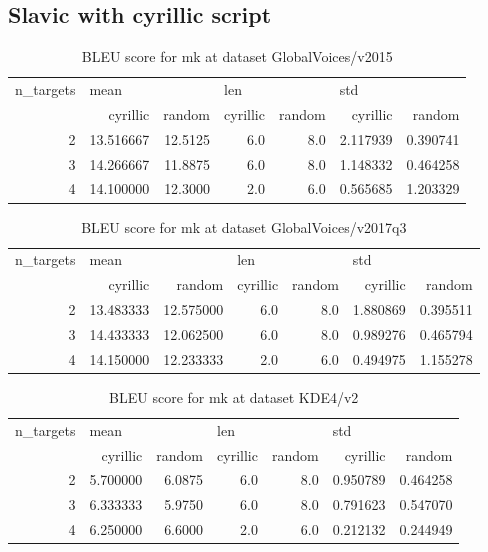 \subsection{Slavic with cyrillic script}

\begin{table}[h]
\begin{tabular}{rrrrrrr}
\toprule
n\_targets & \multicolumn{2}{l}{mean} & \multicolumn{2}{l}{len} & \multicolumn{2}{l}{std} \\
          &   cyrillic &   random & cyrillic & random &  cyrillic &    random \\
\midrule
        2 &  13.516667 &  12.5125 &      6.0 &    8.0 &  2.117939 &  0.390741 \\
        3 &  14.266667 &  11.8875 &      6.0 &    8.0 &  1.148332 &  0.464258 \\
        4 &  14.100000 &  12.3000 &      2.0 &    6.0 &  0.565685 &  1.203329 \\
\bottomrule
\end{tabular}

\caption{BLEU score for  mk at dataset GlobalVoices/v2015 }
\label{ table:mk/GlobalVoices/v2015 }
\end{table}

\begin{table}[h]
\begin{tabular}{rrrrrrr}
\toprule
n\_targets & \multicolumn{2}{l}{mean} & \multicolumn{2}{l}{len} & \multicolumn{2}{l}{std} \\
          &   cyrillic &     random & cyrillic & random &  cyrillic &    random \\
\midrule
        2 &  13.483333 &  12.575000 &      6.0 &    8.0 &  1.880869 &  0.395511 \\
        3 &  14.433333 &  12.062500 &      6.0 &    8.0 &  0.989276 &  0.465794 \\
        4 &  14.150000 &  12.233333 &      2.0 &    6.0 &  0.494975 &  1.155278 \\
\bottomrule
\end{tabular}

\caption{BLEU score for  mk at dataset GlobalVoices/v2017q3 }
\label{ table:mk/GlobalVoices/v2017q3 }
\end{table}

\begin{table}[h]
\begin{tabular}{rrrrrrr}
\toprule
n\_targets & \multicolumn{2}{l}{mean} & \multicolumn{2}{l}{len} & \multicolumn{2}{l}{std} \\
          &  cyrillic &  random & cyrillic & random &  cyrillic &    random \\
\midrule
        2 &  5.700000 &  6.0875 &      6.0 &    8.0 &  0.950789 &  0.464258 \\
        3 &  6.333333 &  5.9750 &      6.0 &    8.0 &  0.791623 &  0.547070 \\
        4 &  6.250000 &  6.6000 &      2.0 &    6.0 &  0.212132 &  0.244949 \\
\bottomrule
\end{tabular}

\caption{BLEU score for  mk at dataset KDE4/v2 }
\label{ table:mk/KDE4/v2 }
\end{table}

